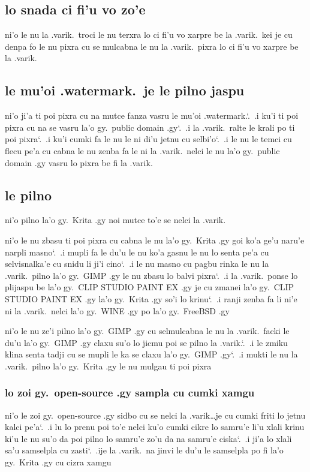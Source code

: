 \documentclass{report}
\newcommand\sds{\spacefactor\sfcode`.\ \space}
\begin{document}
\subsection{lo snada ci fi'u vo zo'e}
ni'o le nu la .varik.\ troci le nu terxra lo ci fi'u vo xarpre be la .varik.\ kei je cu denpa fo le nu pixra cu se mulcabna le nu la .varik.\ pixra lo ci fi'u vo xarpre be la .varik.
\subsection{le mu'oi .watermark.\ je le pilno jaspu}
ni'o ji'a ti poi pixra cu na mutce fanza vasru le mu'oi .watermark.\sds  .i ku'i ti poi pixra cu na se vasru la'o gy.\ public domain .gy\sds  .i la .varik.\ ralte le krali po ti poi pixra\sds  .i ku'i cumki fa le nu le ni di'u jetnu cu selbi'o\sds  .i le nu le temci cu flecu pe'a cu cabna le nu zenba fa le ni la .varik.\ nelci le nu la'o gy.\ public domain .gy vasru lo pixra be fi la .varik.

\subsection{le pilno}
ni'o pilno la'o gy.\ Krita .gy noi mutce to'e se nelci la .varik.

ni'o le nu zbasu ti poi pixra cu cabna le nu la'o gy.\ Krita .gy goi ko'a ge'u naru'e narpli masno\sds  .i mupli fa le du'u le nu ko'a gasnu le nu lo senta pe'a cu selvisnalka'e cu snidu li ji'i cino\sds  .i le nu masno cu pagbu rinka le nu la .varik.\ pilno la'o gy.\ GIMP .gy le nu zbasu lo balvi pixra\sds  .i la .varik.\ ponse lo plijaspu be la'o gy.\ CLIP STUDIO PAINT EX .gy je cu zmanei la'o gy.\ CLIP STUDIO PAINT EX .gy la'o gy.\ Krita .gy so'i lo krinu\sds  .i ranji zenba fa li ni'e ni la .varik.\ nelci la'o gy.\ WINE .gy po la'o gy.\ FreeBSD .gy

ni'o le nu ze'i pilno la'o gy.\ GIMP .gy cu selmulcabna le nu la .varik.\ facki le du'u la'o gy.\ GIMP .gy claxu su'o lo jicmu poi se pilno la .varik.\sds  .i le zmiku klina senta tadji cu se mupli le ka se claxu la'o gy.\ GIMP .gy\sds  .i mukti le nu la .varik.\ pilno la'o gy.\ Krita .gy le nu mulgau ti poi pixra

\subsubsection{lo zoi gy.\ open-source .gy sampla cu cumki xamgu}
ni'o le zoi gy.\ open-source .gy sidbo cu se nelci la .varik\ldots je cu cumki friti lo jetnu kalci pe'a\sds  .i lu lo prenu poi to'e nelci ku'o cumki cikre lo samru'e li'u xlali krinu ki'u le nu su'o da poi pilno lo samru'e zo'u da na samru'e ciska\sds  .i ji'a lo xlali sa'u samselpla cu zasti\sds  .ije la .varik.\ na jinvi le du'u le samselpla po fi la'o gy.\ Krita .gy cu cizra xamgu
\end{document}
